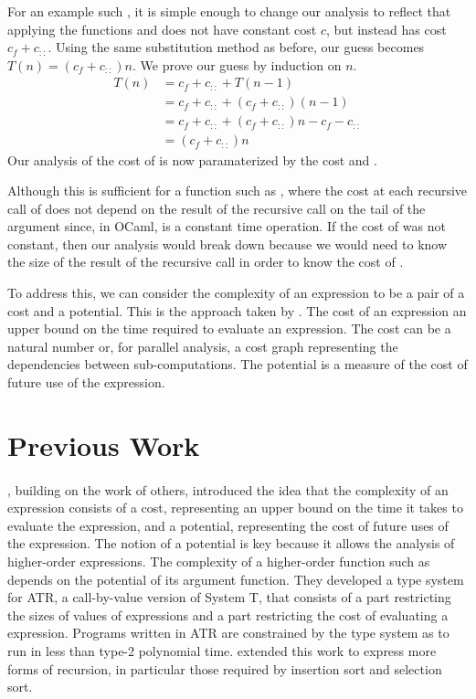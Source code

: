 For an example such , it is simple enough to change our analysis to
reflect that applying the functions  and \T{::} does not have constant
cost $c$, but instead has cost $c_f + c_{::}$.  Using the same substitution
method as before, our guess becomes $T(n) = (c_f + c_{::})n$.  We prove our
guess by induction on $n$.
%
\begin{align*}
  T(n) &= c_f + c_{::} + T(n-1) \\
       &= c_f + c_{::} + (c_f + c_{::})(n-1) \\
       &= c_f + c_{::} + (c_f + c_{::})n - c_f - c_{::}  \\
       &= (c_f + c_{::})n
\end{align*}
%
Our analysis of the cost of  is now paramaterized by the cost  and
\T{::}.

Although this is sufficient for a function such as , where the cost at
each recursive call of  does not depend on the result of the recursive
call on the tail of the argument since, in OCaml, \T{::} is a constant time
operation.  If the cost of \T{::} was not constant, then our analysis would
break down because we would need to know the size of the result of the
recursive call in order to know the cost of \T{::}.

To address this, we can consider the complexity of an expression to be a
pair of a cost and a potential.  This is the approach taken by
\citet{Danner2007}.  The cost of an expression an upper bound on the time
required to evaluate an expression.  The cost can be a natural number or, for
parallel analysis, a cost graph representing the dependencies between
sub-computations.  The potential is a measure of the cost of future use of the
expression.

\section{Previous Work}

\paragraph{}
\citet{Danner2007}, building on the work of others, introduced the
idea that the complexity of an expression consists of a cost, representing an
upper bound on the time it takes to evaluate the expression, and a potential,
representing the cost of future uses of the expression.  The notion of a
potential is key because it allows the analysis of higher-order expressions.
The complexity of a higher-order function such as  depends on the
potential of its argument function.  They developed a type system for ATR, a
call-by-value version of System T, that consists of a part restricting the sizes of
values of expressions and a part restricting the cost of evaluating a
expression.  Programs written in ATR are constrained by the type system as to
run in less than type-2 polynomial time.  \citet{Danner2009} extended this work
to express more forms of recursion, in particular those required by insertion
sort and selection sort.

